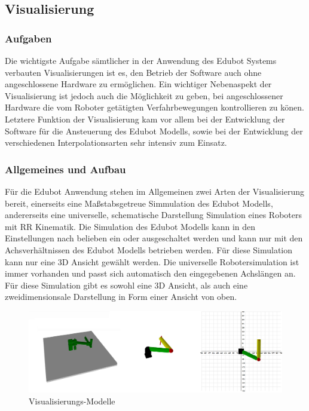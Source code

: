 \subsection{Visualisierung}

\subsubsection{Aufgaben}
Die wichtigste Aufgabe sämtlicher in der Anwendung des Edubot Systems verbauten Visualisierungen ist es, den Betrieb der Software auch ohne angeschlossene Hardware zu ermöglichen. Ein wichtiger Nebenaspekt der Visualisierung ist jedoch auch die Möglichkeit zu geben, bei angeschlossener Hardware die vom Roboter getätigten Verfahrbewegungen kontrollieren zu könen.
Letztere Funktion der Visualisierung kam vor allem bei der Entwicklung der Software für die Ansteuerung des Edubot Modells, sowie bei der Entwicklung der verschiedenen Interpolationsarten sehr intensiv zum Einsatz. 

\subsubsection{Allgemeines und Aufbau}
Für die Edubot Anwendung stehen im Allgemeinen zwei Arten der Visualisierung bereit, einerseits eine Maßstabsgetreue Simmulation des Edubot Modells, andererseits eine universelle, schematische Darstellung Simulation eines Roboters mit RR Kinematik. 
Die Simulation des Edubot Modells kann in den Einstellungen nach belieben ein oder ausgeschaltet werden und kann nur mit den Achsverhältnissen des Edubot Modells betrieben werden. Für diese Simulation kann nur eine 3D Ansicht gewählt werden.
Die universelle Robotersimulation ist immer vorhanden und passt sich automatisch den eingegebenen Achslängen an. Für diese Simulation gibt es sowohl eine 3D Ansicht, als auch eine zweidimensionsale Darstellung in Form einer Ansicht von oben.

\begin{figure}[H]
  \centering
  \begin{minipage}[t]{12 cm}
  	\centering
  	\includegraphics[width=12cm]{images/3DModels} 
    \caption{Visualisierungs-Modelle}
  \end{minipage}
\end{figure} 

